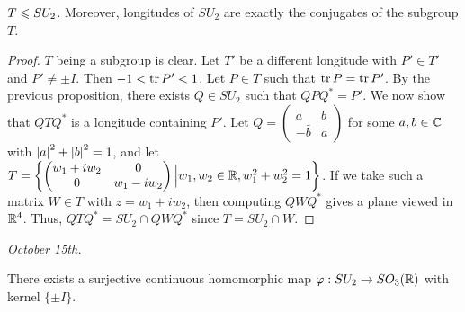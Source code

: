 \begin{proposition}
    $T \leqslant SU_{2}$. Moreover, longitudes of $SU_{2}$ are exactly the conjugates of the subgroup $T$.
\end{proposition}
\begin{proof}
    $T$ being a subgroup is clear. Let $T'$ be a different longitude with $P' \in T'$ and $P' \neq \pm I$. Then $-1 < \operatorname{tr} P' < 1$. Let $P \in T$ such that $\operatorname{tr} P = \operatorname{tr} P'$. By the previous proposition, there exists $Q \in SU_{2}$ such that $QPQ^{\ast} = P'$. We now show that $QTQ^{\ast}$ is a longitude containing $P'$. Let $Q = \begin{pmatrix}
        a & b \\ -\bar{b} & \bar{a}
    \end{pmatrix}$ for some $a,b \in \mathbb{C}$ with $\left| a \right|^{2} + \left| b \right|^{2} = 1$, and let $T = \left\{ \begin{pmatrix}
        w_{1} + iw_{2} & 0 \\ 0 & w_{1} - iw_{2}
    \end{pmatrix} \Big| w_{1},w_{2} \in \mathbb{R}, w_{1}^{2} + w_{2}^{2} = 1 \right\}$. If we take such a matrix $W \in T$ with $z = w_{1}+iw_{2}$, then computing $QWQ^{\ast}$ gives a plane viewed in $\mathbb{R}^{4}$. Thus, $QTQ^{\ast} = SU_{2} \cap QWQ^{\ast}$ since $T = SU_{2} \cap W$.
\end{proof}

\textit{October 15th.}

\begin{proposition}
    There exists a surjective continuous homomorphic map $\varphi : SU_{2} \to SO_{3}(\mathbb{R})$ with kernel $\{\pm I\}$.
\end{proposition}

